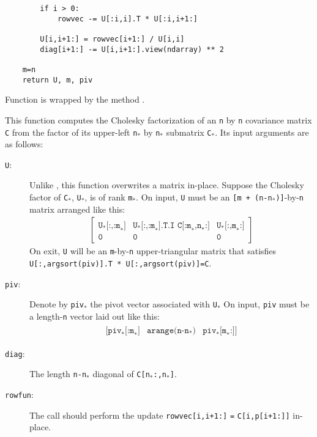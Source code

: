 \documentclass{manual}
\begin{document}
\begin{description}
\begin{verbatim}
        if i > 0:
            rowvec -= U[:i,i].T * U[:i,i+1:]
        
        U[i,i+1:] = rowvec[i+1:] / U[i,i]
        diag[i+1:] -= U[i,i+1:].view(ndarray) ** 2
    
    m=n
    return U, m, piv
\end{verbatim}

Function  is wrapped by the  method .

\item[\function{m, piv = ichol_continue(U, diag, reltol, rowfun, piv)}:]
This function computes the Cholesky factorization of an \texttt{n} by \texttt{n} covariance matrix \texttt{C} from the factor of its upper-left \texttt{n}$_*$ by \texttt{n}$_*$ submatrix \texttt{C}$_*$. Its input arguments are as follows:
\begin{description}
    \item[\texttt{U}:] Unlike , this function overwrites a matrix in-place. Suppose the Cholesky factor of \texttt{C}$_*$, \texttt{U}$_*$, is of rank \texttt{m}$_*$. On input, \texttt{U} must be an \texttt{[m + (n-n$_*$)]}-by-\texttt{n} matrix arranged like this:
    \begin{eqnarray*}
        \left[
        \begin{array}{ccc}
            \texttt{U}_*\texttt{[:,:m}_*\texttt{]} & \texttt{U}_*\texttt{[:,:m}_*\texttt{].T.I C[:m}_*\texttt{,n}_*\texttt{:]} & \texttt{U}_*\texttt{[:,m}_*\texttt{:]}\\
            \texttt{0}&\texttt{0}&\texttt{0}
        \end{array}
        \right]
    \end{eqnarray*}
On exit, \texttt{U} will be an \texttt{m}-by-\texttt{n} upper-triangular matrix that satisfies \texttt{U[:,argsort(piv)].T * U[:,argsort(piv)]=C}.
    \item[\texttt{piv}:] Denote by \texttt{piv}$_*$ the pivot vector associated with \texttt{U}$_*$ On input, \texttt{piv} must be a length-\texttt{n} vector laid out like this:
    \begin{eqnarray*}
        \begin{array}{ccc}
            [\texttt{piv}_*\texttt{[:m}_*\texttt{]} & \texttt{arange(n-n$_*$)} & \texttt{piv}_*\texttt{[m}_*\texttt{:]}]
        \end{array}
    \end{eqnarray*}
    \item[\texttt{diag}:] The length \texttt{n-n}$_*$ diagonal of \texttt{C[n$_*$:,n$_*$]}.
    \item[\texttt{rowfun}:] The call  should perform the update \texttt{rowvec[i,i+1:]} \texttt{=} \texttt{C[i,p[i+1:]]} in-place.
\end{description}


\end{description}
\end{document}
